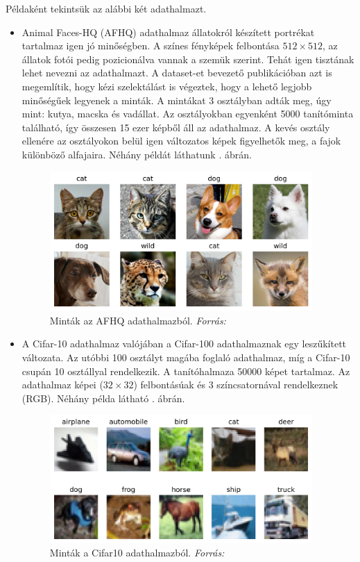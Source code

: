 Példaként tekintsük az alábbi két adathalmazt.
\begin{itemize}
	\item Animal Faces-HQ (AFHQ) \cite{choi2020stargan} adathalmaz állatokról készített portrékat tartalmaz igen jó minőségben. A színes fényképek felbontása $ 512 \times 512 $, az állatok fotói pedig pozicionálva vannak a szemük szerint. Tehát igen tisztának lehet nevezni az adathalmazt. A dataset-et bevezető publikációban azt is megemlítik, hogy kézi szelektálást is végeztek, hogy a lehető legjobb minőségűek legyenek a minták. A mintákat 3 osztályban adták meg, úgy mint: kutya, macska és vadállat. Az osztályokban egyenként 5000 tanítóminta található, így összesen 15 ezer képből áll az adathalmaz. A kevés osztály ellenére az osztályokon belül igen változatos képek figyelhetők meg, a fajok különböző alfajaira. Néhány példát láthatunk . ábrán.
	
	\begin{figure}[h]
		\centering
		\includegraphics[width=10cm]{images/afhq_dataset_samples.png}
		\caption{Minták az AFHQ adathalmazból. \textit{Forrás:} \cite{choi2020stargan}}
		\label{fig:afhq_dataset_samples}
	\end{figure}
	
	\item A Cifar-10 \cite{krizhevsky2009learning} adathalmaz valójában a Cifar-100 adathalmaznak egy leszűkített változata. Az utóbbi 100 osztályt magába foglaló adathalmaz, míg a Cifar-10 csupán 10 osztállyal rendelkezik. A tanítóhalmaza 50000 képet tartalmaz.
	Az adathalmaz képei ($32 \times 32$) felbontásúak és 3 színcsatornával rendelkeznek (RGB). Néhány példa látható . ábrán.
	
	\begin{figure}[h]
		\centering
		\includegraphics[width=10cm]{images/cifar10_dataset_samples.png}
		\caption{Minták a Cifar10 adathalmazból. \textit{Forrás:} \cite{krizhevsky2009learning}}
		\label{fig:cifar10_dataset_samples}
	\end{figure}
\end{itemize}

